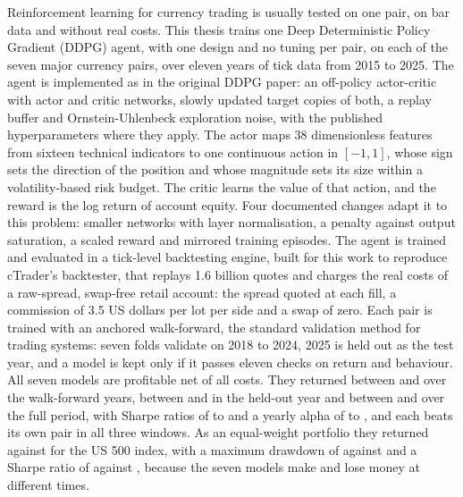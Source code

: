 \acresetall
\noindent Reinforcement learning for currency trading is usually tested on one pair, on bar data and without real costs. This thesis trains one Deep Deterministic Policy Gradient (DDPG) agent, with one design and no tuning per pair, on each of the seven major currency pairs, over eleven years of tick data from 2015 to 2025. The agent is implemented as in the original DDPG paper: an off-policy actor-critic with actor and critic networks, slowly updated target copies of both, a replay buffer and Ornstein-Uhlenbeck exploration noise, with the published hyperparameters where they apply. The actor maps 38 dimensionless features from sixteen technical indicators to one continuous action in $[-1, 1]$, whose sign sets the direction of the position and whose magnitude sets its size within a volatility-based risk budget. The critic learns the value of that action, and the reward is the log return of account equity. Four documented changes adapt it to this problem: smaller networks with layer normalisation, a penalty against output saturation, a scaled reward and mirrored training episodes. The agent is trained and evaluated in a tick-level backtesting engine, built for this work to reproduce cTrader's backtester, that replays 1.6 billion quotes and charges the real costs of a raw-spread, swap-free retail account: the spread quoted at each fill, a commission of 3.5 US dollars per lot per side and a swap of zero. Each pair is trained with an anchored walk-forward, the standard validation method for trading systems: seven folds validate on 2018 to 2024, 2025 is held out as the test year, and a model is kept only if it passes eleven checks on return and behaviour. All seven models are profitable net of all costs. They returned between \ResultStitchedMin{} and \ResultStitchedMax{} over the walk-forward years, between \ResultTestMin{} and \ResultTestMax{} in the held-out year and between \ResultFullMin{} and \ResultFullMax{} over the full period, with Sharpe ratios of \ResultSharpeMin{} to \ResultSharpeMax{} and a yearly alpha of \ResultAlphaMin{} to \ResultAlphaMax{}, and each beats its own pair in all three windows. As an equal-weight portfolio they returned \ResultPortfolioReturn{} against \ResultBenchmarkReturn{} for the US 500 index, with a maximum drawdown of \ResultPortfolioDrawdown{} against \ResultBenchmarkDrawdown{} and a Sharpe ratio of \ResultPortfolioSharpe{} against \ResultBenchmarkSharpe{}, because the seven models make and lose money at different times.
